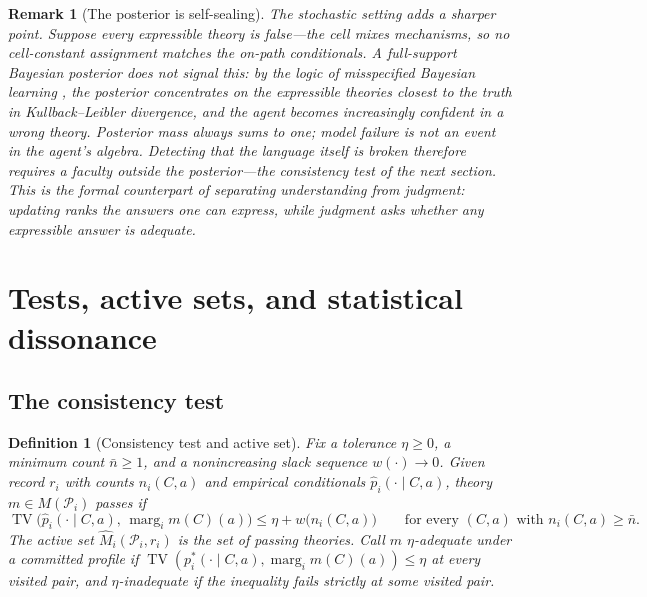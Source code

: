 \documentclass[11pt]{article}
\newtheorem{definition}[assumption]{Definition}
\newtheorem{remark}[assumption]{Remark}
\newcommand{\TV}{\operatorname{TV}}
\newcommand{\marg}[1]{\operatorname{marg}_{#1}}
\begin{document}
\begin{remark}[The posterior is self-sealing]
\label{rem:self-sealing}
The stochastic setting adds a sharper point.  Suppose every expressible theory
is false---the cell mixes mechanisms, so no cell-constant assignment matches
the on-path conditionals.  A full-support Bayesian posterior does not signal
this: by the logic of misspecified Bayesian learning \citep{Berk1966}, the
posterior concentrates on the expressible theories closest to the truth in
Kullback--Leibler divergence, and the agent becomes increasingly
\emph{confident} in a wrong theory.  Posterior mass always sums to one; model
failure is not an event in the agent's algebra.  Detecting that the language
itself is broken therefore requires a faculty outside the posterior---the
consistency test of the next section.  This is the formal counterpart of
separating understanding from judgment: updating ranks the answers one can
express, while judgment asks whether any expressible answer is adequate.
\end{remark}

\section{Tests, active sets, and statistical dissonance}
\label{sec:dissonance}

\subsection{The consistency test}

\begin{definition}[Consistency test and active set]
\label{def:test}
Fix a tolerance $\eta\geq0$, a minimum count $\bar n\geq1$, and a
nonincreasing slack sequence $w(\cdot)\to0$.  Given record $r_i$ with counts
$n_i(C,a)$ and empirical conditionals $\hat p_i(\cdot\mid C,a)$, theory
$m\in M(\mathcal P_i)$ \emph{passes} if
\begin{equation}
\TV\bigl(\hat p_i(\cdot\mid C,a),\,\marg{i}m(C)(a)\bigr)
\leq
\eta+w\bigl(n_i(C,a)\bigr)
\qquad
\text{for every }(C,a)\text{ with }n_i(C,a)\geq\bar n.
\label{eq:test}
\end{equation}
The \emph{active set} $\widehat M_i(\mathcal P_i,r_i)$ is the set of passing
theories.  Call $m$ \emph{$\eta$-adequate} under a committed profile if
$\TV(p_i^{*}(\cdot\mid C,a),\marg{i}m(C)(a))\leq\eta$ at every visited pair,
and \emph{$\eta$-inadequate} if the inequality fails strictly at some visited
pair.
\end{definition}
\end{document}
